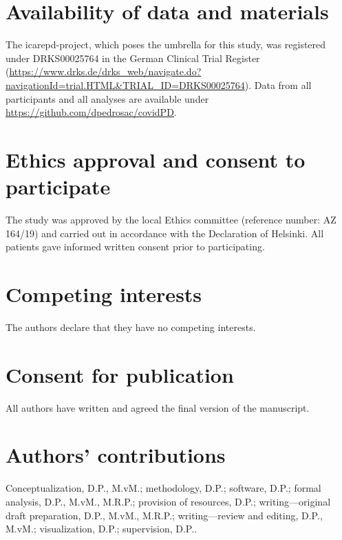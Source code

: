 \documentclass{bmcart}
\begin{document}
\begin{backmatter}
\section*{Availability of data and materials}
The \acs{icarepd}-project, which poses the umbrella for this study, was registered under DRKS00025764 in the German Clinical Trial Register (\url{https://www.drks.de/drks_web/navigate.do?navigationId=trial.HTML&TRIAL_ID=DRKS00025764}). Data from all participants and all analyses are available under \url{https://github.com/dpedrosac/covidPD}.

\section*{Ethics approval and consent to participate}%
The study was approved by the local Ethics committee (reference number: AZ 164/19) and carried out in accordance with the Declaration of Helsinki. All patients gave informed written consent prior to participating. 

\section*{Competing interests}
The authors declare that they have no competing interests.

\section*{Consent for publication}%
All authors have written and agreed the final version of the manuscript. 

\section*{Authors' contributions}
Conceptualization, D.P., M.vM.; methodology, D.P.; software, D.P.; formal analysis, D.P., M.vM., M.R.P.; provision of resources, D.P.; writing—original draft preparation, D.P., M.vM., M.R.P.; writing—review and editing, D.P., M.vM.; visualization, D.P.; supervision, D.P..




\end{backmatter}
\end{document}
